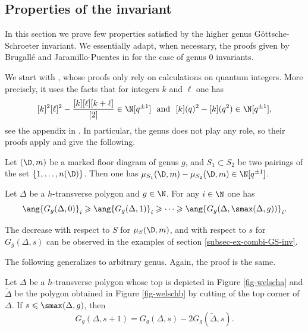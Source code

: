 \subsection{Properties of the invariant}

In this section we prove few properties satisfied by the higher genus Göttsche-Schroeter invariant. We essentially adapt, when necessary, the proofs given by Brugallé and Jaramillo-Puentes in \cite{brugalle_polynomiality_2022} for the case of genus $0$ invariants.


We start with \cite[Proposition 2.16 and Corollary 2.17]{brugalle_polynomiality_2022}, whose proofs only rely on calculations on quantum integers. More precisely, it uses the facts that for integers $k$ and $\ell$ one has \[ [k]^2 [\ell]^2-\dfrac{[k][\ell][k+\ell]}{[2]} \in\N[q^{\pm1}] \ \text{ and }\ [k](q)^2 - [k](q^2) \in\N[q^{\pm1}] ,  \] see the appendix in \cite{brugalle_polynomiality_2022}. In particular, the genus does not play any role, so their proofs apply and give the following.

\begin{prop}
Let $(\D,m)$ be a marked floor diagram of genus $g$, and $S_1 \subset S_2$ be two pairings of the set $\{1,\dots,n(\D)\}$. Then one has $\mu_{S_1}(\D,m) - \mu_{S_2}(\D,m) \in \N[q^{\pm 1}]$. 
\end{prop}

\begin{coro} \label{coro-decrease-with-s}
Let $\Delta$ be a $h$-transverse polygon and $g\in\N$. For any $i\in\N$ one has
\[ \ang{G_g(\Delta,0)}_i \geqslant \ang{G_g(\Delta,1)}_i \geqslant \dots \geqslant \ang{G_g(\Delta,\smax(\Delta,g))}_i . \]
\end{coro}


The decrease with respect to $S$ for $\mu_S(\D,m)$, and with respect to $s$ for $G_g(\Delta,s)$ can be observed in the examples of section \ref{subsec-ex-combi-GS-inv}.

The following generalizes \cite[Proposition 2.19]{brugalle_polynomiality_2022} to arbitrary genus. Again, the proof is the same.


\begin{prop} \label{prop-welsch}
Let $\Delta$ be a $h$-transverse polygon whose top is depicted in Figure \ref{fig-welscha} and $\widetilde\Delta$ be the polygon obtained in Figure \ref{fig-welschb} by cutting of the top corner of $\Delta$. 
If $s \leqslant \smax(\Delta,g)$, then 
\[ G_g(\Delta,s+1) = G_g(\Delta,s) - 2 G_g(\widetilde \Delta,s) . \]
\end{prop}

